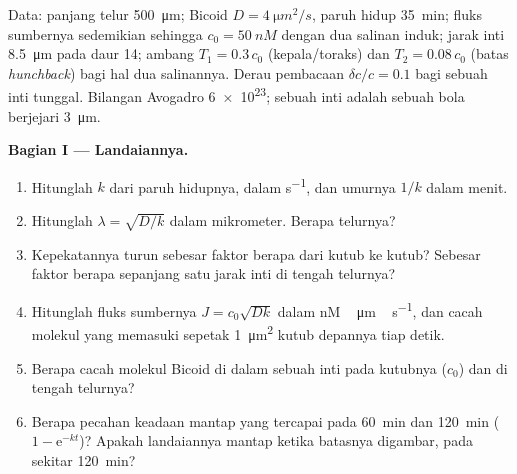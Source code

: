 \begin{problem}
\label{pb:b3:developmental-genetics:1}
Data: panjang telur \qty{500}{\micro m}; Bicoid $D = \qty{4}{\micro m^2/s}$,
paruh hidup \qty{35}{min}; fluks sumbernya sedemikian sehingga $c_{0} = \qty{50}{nM}$
dengan dua salinan induk; jarak inti \qty{8.5}{\micro m} pada daur
14; ambang $T_{1} = 0.3\,c_{0}$ (kepala/toraks) dan $T_{2} =
0.08\,c_{0}$ (batas \emph{hunchback}) bagi hal dua salinannya. Derau
pembacaan $\delta c/c = 0.1$ bagi sebuah inti tunggal. Bilangan Avogadro
\qty{6e23}{}; sebuah inti adalah sebuah bola berjejari \qty{3}{\micro m}.

\medskip
\noindent\textbf{Bagian I --- Landaiannya.}
\begin{enumerate}
  \item Hitunglah $k$ dari paruh hidupnya, dalam \unit{s^{-1}}, dan
        umurnya $1/k$ dalam menit.
  \item Hitunglah $\lambda = \sqrt{D/k}$ dalam mikrometer. Berapa  telurnya?
  \item Kepekatannya turun sebesar faktor berapa dari kutub ke kutub? Sebesar
        faktor berapa sepanjang satu jarak inti di tengah telurnya?
  \item Hitunglah fluks sumbernya $J = c_{0}\sqrt{Dk}$ dalam
        \unit{nM\,\micro m\,s^{-1}}, dan cacah molekul
        yang memasuki sepetak \qty{1}{\micro m^2} kutub depannya tiap
        detik.
  \item Berapa cacah molekul Bicoid di dalam sebuah inti pada kutubnya ($c_{0}$)
        dan di tengah telurnya?
  \item Berapa pecahan keadaan mantap yang tercapai pada \qty{60}{min} dan
        \qty{120}{min} ($1 - \mathrm{e}^{-kt}$)? Apakah landaiannya mantap
        ketika batasnya digambar, pada sekitar \qty{120}{min}?
\end{enumerate}


\end{problem}
